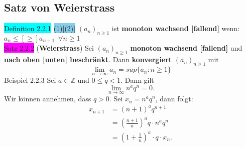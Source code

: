 \documentclass[landscape, 10pt]{article}
\newcommand{\Z}{\mathbb{Z}}
\begin{document}
\begin{multicols}{3}
       \subsection{Satz von Weierstrass}
              \colorbox{cyan}{Definition 2.2.1} 
                     \colorbox{SkyBlue}{(1)[(2)]} 
                     $(a_n)_{n\geqslant 1}$ ist \textbf{monoton
                     wachsend [fallend]} wenn: \textcolor{NavyBlue}{
                     $a_n\leqslant[\geqslant]a_{n+1}\enspace\forall n\geqslant1$}\\
              \colorbox{magenta}{Satz 2.2.2} 
              (\textbf{Weierstrass}) 
                     Sei \textcolor{NavyBlue}{$(a_n)_{n\geqslant 1}$}
                     \textbf{monoton wachsend 
                     [fallend]} und \textbf{nach oben [unten] beschränkt}. Dann 
                     \textbf{konvergiert} 
                     \textcolor{NavyBlue}{$(a_n)_{n\geqslant 1}$} mit 
                     \begin{equation*}
                            \lim\limits_{n\to\infty}a_n=sup\{a_n:n\geqslant 1\}
                     \end{equation*}
                     \begin{equation*}
                            [\lim\limits_{n\to\infty}a_n=inf\{a_n:n\geqslant 1\}]
                     \end{equation*}
              \colorbox{Dandelion}{Beispiel 2.2.3} 
                     Sei \textcolor{NavyBlue}{$a\in\Z$} und 
                     \textcolor{NavyBlue}{$0\leqslant q<1$}.
                     Dann gilt 
                     \begin{equation*}
                            \lim\limits_{n\to\infty}n^aq^n=0.
                     \end{equation*}
                     Wir können annehmen, dass 
                     \textcolor{NavyBlue}{$q>0$}. Sei 
                     \textcolor{NavyBlue}{$x_n=n^aq^n$}, 
                     dann folgt:
                     \begin{align*}
                            x_{n+1}&=(n+1)^aq^{n+1}\\
                                   &=(\frac{n+1}{n})^aq\cdot n^aq^n\\
                                   &=(1+\frac{1}{n})^a\cdot q\cdot x_n.
                     \end{align*}

\end{multicols}
\end{document}
